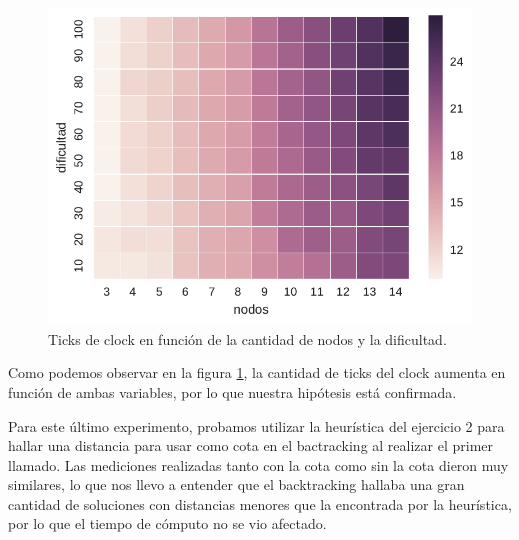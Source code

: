 \begin{figure}[H]
  \begin{center}
    \includegraphics[scale = 0.5]{imagenes/ej1_conHeuristica.pdf}
    \caption{Ticks de clock en función de la cantidad de nodos y la dificultad.}
    \label{fig:ej1_conHeuristica}
  \end{center}
\end{figure}

Como podemos observar en la figura \ref{fig:ej1_conHeuristica}, la cantidad de ticks del clock aumenta en función de ambas variables, por lo que nuestra hipótesis está confirmada.

Para este último experimento, probamos utilizar la heurística del ejercicio 2 para hallar una distancia para usar como cota en el bactracking al realizar el primer llamado. Las mediciones realizadas tanto con la cota como sin la cota dieron muy similares, lo que nos llevo a entender que el backtracking hallaba una gran cantidad de soluciones con distancias menores que la encontrada por la heurística, por lo que el tiempo de cómputo no se vio afectado. 